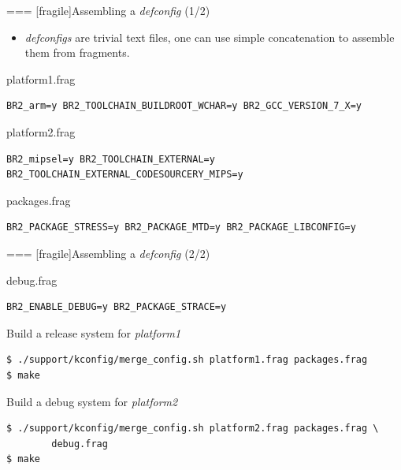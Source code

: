 === [fragile]{Assembling a {\em defconfig} (1/2)}

  \begin{itemize}
  \item {\em defconfigs} are trivial text files, one can use simple
    concatenation to assemble them from fragments.
  \end{itemize}

{\small
   \begin{block}{platform1.frag}
\begin{verbatim}
BR2_arm=y BR2_TOOLCHAIN_BUILDROOT_WCHAR=y BR2_GCC_VERSION_7_X=y
\end{verbatim}
   \end{block}
}

{\small
    \begin{block}{platform2.frag}
\begin{verbatim}
BR2_mipsel=y BR2_TOOLCHAIN_EXTERNAL=y BR2_TOOLCHAIN_EXTERNAL_CODESOURCERY_MIPS=y
\end{verbatim}
    \end{block}
}

{\small
   \begin{block}{packages.frag}
\begin{verbatim}
BR2_PACKAGE_STRESS=y BR2_PACKAGE_MTD=y BR2_PACKAGE_LIBCONFIG=y
\end{verbatim}
   \end{block}
}



=== [fragile]{Assembling a {\em defconfig} (2/2)}

  \begin{block}{debug.frag}
    {\scriptsize
\begin{verbatim}
BR2_ENABLE_DEBUG=y BR2_PACKAGE_STRACE=y
\end{verbatim}
    }
  \end{block}

  \begin{block}{Build a release system for {\em platform1}}
    {\scriptsize
\begin{verbatim}
$ ./support/kconfig/merge_config.sh platform1.frag packages.frag
$ make
\end{verbatim}
    }
  \end{block}

  \begin{block}{Build a debug system for {\em platform2}}
    {\scriptsize
\begin{verbatim}
$ ./support/kconfig/merge_config.sh platform2.frag packages.frag \
        debug.frag
$ make
\end{verbatim}
    }
  \end{block}


